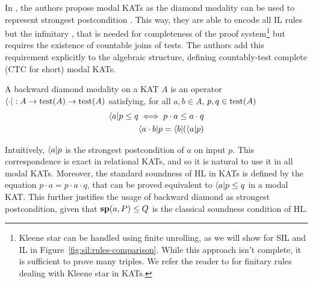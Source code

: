 In \cite{MOH21}, the authors propose modal KATs as the diamond modality can be used to represent strongest postcondition \cite{DMS06}. This way, they are able to encode all IL rules but the infinitary , that is needed for completeness of the proof system\footnote{Kleene star can be handled using finite unrolling, as we will show for SIL and IL in Figure~\ref{fig:sil:rules-comparison}. While this approach isn't complete, it is sufficient to prove many triples. We refer the reader to \cite[Figure~2]{MOH21} for finitary rules dealing with Kleene star in KATs.} but requires the existence of countable joins of tests. The authors add this requirement explicitly to the algebraic structure, defining countably-test complete (CTC for short) modal KATs.
\begin{definition}
	A backward diamond modality on a KAT $A$ is an operator $\langle \cdot \vert : A \rightarrow \text{test}(A) \rightarrow \text{test}(A)$ satisfying, for all $a, b \in A$, $p, q \in \text{test}(A)$
	\begin{align*}
		\langle a \vert p \le q \iff p \cdot a \le a \cdot q \\
		\langle a \cdot b \vert p = \langle b \vert (\langle a \vert p)
	\end{align*}
\end{definition}
Intuitively, $\langle a \vert p$ is the strongest postcondition of $a$ on input $p$. This correspondence is exact in relational KATs, and so it is natural to use it in all modal KATs. Moreover, the standard soundness of HL in KATs is defined by the equation $p \cdot a = p \cdot a \cdot q$, that can be proved equivalent to $\langle a \vert p \le q$ in a modal KAT. This further justifies the usage of backward diamond as strongest postcondition, given that $\textbf{sp}(a, P) \le Q$ is the classical soundness condition of HL.

